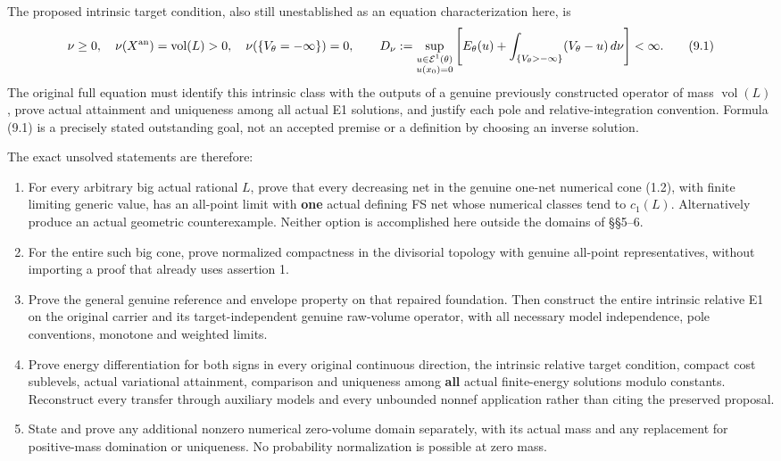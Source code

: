 \documentclass[10pt]{article}
\providecommand{\tightlist}{\setlength{\itemsep}{0pt}\setlength{\parskip}{0pt}}
\begin{document}
The proposed intrinsic target condition, also still unestablished as an
equation characterization here, is \[
 \nu\geq0,\quad \nu(X^{\rm an})=\operatorname{vol}(L)>0,\quad
 \nu(\{V_\theta=-\infty\})=0,\qquad
 D_\nu:=\sup_{\substack{u\in\mathcal E^1(\theta)\\u(x_0)=0}}
       \left[E_\theta(u)+\int_{\{V_\theta>-\infty\}}(V_\theta-u)\,d\nu\right]<\infty.
 \tag{9.1}
\] The original full equation must identify this intrinsic class with
the outputs of a genuine previously constructed operator of mass
\(\operatorname{vol}(L)\), prove actual attainment and uniqueness among
all actual E1 solutions, and justify each pole and relative-integration
convention. Formula (9.1) is a precisely stated outstanding goal, not an
accepted premise or a definition by choosing an inverse solution.

The exact unsolved statements are therefore:

\begin{enumerate}
\def\labelenumi{\arabic{enumi}.}
\tightlist
\item
  For every arbitrary big actual rational \(L\), prove that every
  decreasing net in the genuine one-net numerical cone (1.2), with
  finite limiting generic value, has an all-point limit with
  \textbf{one} actual defining FS net whose numerical classes tend to
  \(c_1(L)\). Alternatively produce an actual geometric counterexample.
  Neither option is accomplished here outside the domains of §§5--6.
\item
  For the entire such big cone, prove normalized compactness in the
  divisorial topology with genuine all-point representatives, without
  importing a proof that already uses assertion 1.
\item
  Prove the general genuine reference and envelope property on that
  repaired foundation. Then construct the entire intrinsic relative E1
  on the original carrier and its target-independent genuine raw-volume
  operator, with all necessary model independence, pole conventions,
  monotone and weighted limits.
\item
  Prove energy differentiation for both signs in every original
  continuous direction, the intrinsic relative target condition, compact
  cost sublevels, actual variational attainment, comparison and
  uniqueness among \textbf{all} actual finite-energy solutions modulo
  constants. Reconstruct every transfer through auxiliary models and
  every unbounded nonnef application rather than citing the preserved
  proposal.
\item
  State and prove any additional nonzero numerical zero-volume domain
  separately, with its actual mass and any replacement for positive-mass
  domination or uniqueness. No probability normalization is possible at
  zero mass.
\end{enumerate}
\end{document}
